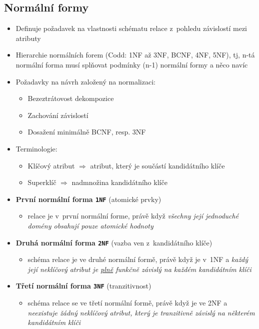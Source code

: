 \documentclass[a4paper,10pt]{article}
\newcommand{\tedy}{$\Rightarrow$ }
\begin{document}
		\subsection{Normální formy}
			\begin{itemize}
				\item Definuje požadavek na vlastnosti schématu relace z~pohledu závislostí mezi atributy
				\item Hierarchie normálních forem (Codd: 1NF až 3NF, BCNF, 4NF, 5NF), tj, n-tá normální forma musí splňovat podmínky (n-1) normální formy a něco navíc
				\item Požadavky na návrh založený na normalizaci:
				\begin{itemize}
					\item Bezeztrátovost dekompozice
					\item Zachování závislostí
					\item Dosažení minimálně BCNF, resp. 3NF
				\end{itemize}
				\item Terminologie:
				\begin{itemize}
					\item Klíčový atribut \tedy atribut, který je součástí kandidátního klíče
					\item Superklíč \tedy nadmnožina kandidátního klíče
				\end{itemize}
			
				\item \textbf{První normální forma \texttt{1NF}} \hfill {\small (atomické prvky)}
				\begin{itemize}
					\item relace je v~první normální forme, právě když \emph{všechny její jednoduché domény obsahují pouze atomické hodnoty}
				\end{itemize}

				\item \textbf{Druhá normální forma \texttt{2NF}} \hfill {\small (vazba ven z~kandidátního klíče)}
				\begin{itemize}
					\item schéma relace je ve druhé normální formě, právě když je v~1NF a \emph{každý její neklíčový atribut je \underline{plně} funkčně závislý na každém kandidátním klíči}
				\end{itemize}

				\item \textbf{Třetí normální forma \texttt{3NF}} \hfill {\small (tranzitivnost)}
				\begin{itemize}
					\item schéma relace se ve třetí normální formě, právě když je ve 2NF a \emph{neexistuje žádný neklíčový atribut, který je tranzitivně závislý na některém kandidátním klíči}
				\end{itemize}


\end{itemize}
\end{document}
